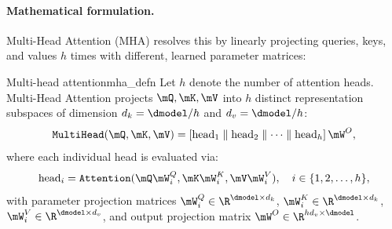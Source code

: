 \documentclass[../../main.tex]{subfiles}
\begin{document}
\paragraph{Mathematical formulation.}
Multi-Head Attention (MHA) resolves this by linearly projecting queries, keys, and values $h$ times with different, learned parameter matrices:
\begin{definition}{Multi-head attention}{mha_defn}
Let $h$ denote the number of attention heads. Multi-Head Attention projects $\mQ, \mK, \mV$ into $h$ distinct representation subspaces of dimension $d_k = \dmodel / h$ and $d_v = \dmodel / h$:
\begin{equation}
\label{eq:mha_formula}
\text{\texttt{MultiHead}}(\mQ, \mK, \mV) = \left[ \text{head}_1 \parallel \text{head}_2 \parallel \dots \parallel \text{head}_h \right] \mW^O,
\end{equation}
where each individual head is evaluated via:
\begin{equation}
\text{head}_i = \text{\texttt{Attention}}(\mQ \mW_i^Q, \mK \mW_i^K, \mV \mW_i^V), \quad i \in \{1, 2, \dots, h\},
\end{equation}
with parameter projection matrices $\mW_i^Q \in \R^{\dmodel \times d_k}$, $\mW_i^K \in \R^{\dmodel \times d_k}$, $\mW_i^V \in \R^{\dmodel \times d_v}$, and output projection matrix $\mW^O \in \R^{h d_v \times \dmodel}$.
\end{definition}
\end{document}
